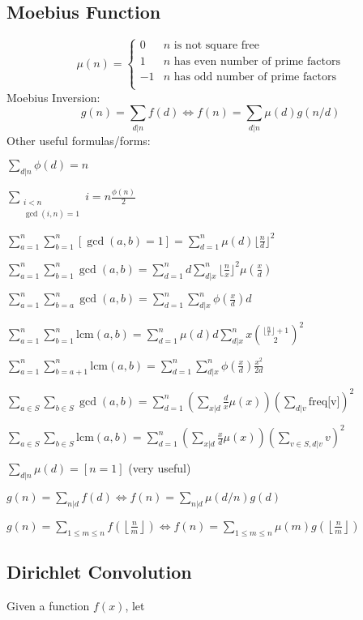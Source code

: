 \subsection{Moebius Function}
\[
	\mu(n) = \begin{cases} 0 & n \textrm{ is not square free}\\ 1 & n \textrm{ has even number of prime factors}\\ -1 & n \textrm{ has odd number of prime factors}\\\end{cases}
\]
  Moebius Inversion:
  \[ g(n) = \sum_{d|n} f(d) \Leftrightarrow f(n) = \sum_{d|n} \mu(d)g(n/d) \]
  Other useful formulas/forms:

  $ \sum_{d|n} \phi(d) = n $
  
  $\sum_{\substack{i<n\\ \gcd(i,n)=1}} i = n \frac{\phi(n)}{2} $

$ \sum_{a=1}^n \sum_{b=1}^n [ \gcd(a, b) = 1] = \sum_{d=1}^n \mu(d) {\lfloor \frac{n}{d} \rfloor}^2 $

$ \sum_{a=1}^n \sum_{b=1}^n \gcd(a, b) = \sum_{d=1}^n d \sum_{d|x}^n {\lfloor \frac{n}{x} \rfloor}^2 \mu{(\frac{x}{d})} $

$ \sum_{a=1}^n \sum_{b=a}^n \gcd(a, b) = \sum_{d=1}^n \sum_{d|x}^n \phi{(\frac{x}{d})} d $

$ \sum_{a=1}^n \sum_{b=1}^n \text{lcm}(a, b) = \sum_{d=1}^n \mu(d) d  \sum_{d|x}^n x \binom{{\lfloor \frac{n}{x} \rfloor} + 1}{2}^2 $

$ \sum_{a=1}^n \sum_{b=a+1}^n \text{lcm}(a, b) = \sum_{d=1}^n \sum_{d|x}^n \phi{(\frac{x}{d})} \frac{x^2}{2d} $

$ \sum_{a \in S} \sum_{b \in S} \gcd(a, b) = \sum_{d=1}^n (\sum_{x|d} \frac{d}{x} \mu(x)) (\sum_{d|v} \text{freq[v]})^2 $

$ \sum_{a \in S} \sum_{b \in S} \text{lcm}(a, b) = \sum_{d=1}^n (\sum_{x|d} \frac{x}{d} \mu(x)) (\sum_{v \in S, d|v} v)^2 $

  $ \sum_{d | n} \mu(d) = [ n = 1] $ (very useful)

  $ g(n) = \sum_{n|d} f(d) \Leftrightarrow f(n) = \sum_{n|d} \mu(d/n)g(d)$

 $ g(n) = \sum_{1 \leq m \leq n} f(\left\lfloor\frac{n}{m}\right \rfloor ) \Leftrightarrow f(n) = \sum_{1\leq m\leq n} \mu(m)g(\left\lfloor\frac{n}{m}\right\rfloor)$


\subsection{Dirichlet Convolution} 
	Given a function $f(x)$, let 

